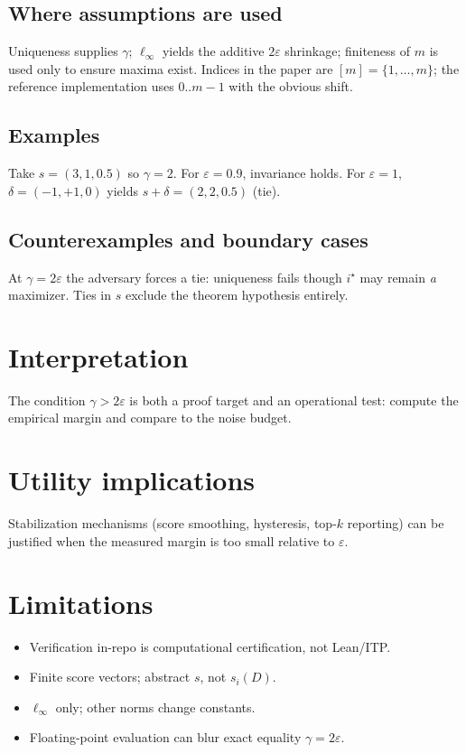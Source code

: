 \documentclass[11pt]{article}
\begin{document}
\subsection{Where assumptions are used}
Uniqueness supplies \(\gamma\); \(\ell_\infty\) yields the additive \(2\varepsilon\)
shrinkage; finiteness of \(m\) is used only to ensure maxima exist.
Indices in the paper are \([m]=\{1,\dots,m\}\); the reference implementation
uses \(0..m-1\) with the obvious shift.

\subsection{Examples}
Take \(s=(3,1,0.5)\) so \(\gamma=2\). For \(\varepsilon=0.9\), invariance holds.
For \(\varepsilon=1\), \(\delta=(-1,+1,0)\) yields \(s+\delta=(2,2,0.5)\) (tie).

\subsection{Counterexamples and boundary cases}
At \(\gamma=2\varepsilon\) the adversary forces a tie: uniqueness fails though
\(i^\star\) may remain \emph{a} maximizer.
Ties in \(s\) exclude the theorem hypothesis entirely.

\section{Interpretation}
The condition \(\gamma>2\varepsilon\) is both a proof target and an operational
test: compute the empirical margin and compare to the noise budget.

\section{Utility implications}
Stabilization mechanisms (score smoothing, hysteresis, top-\(k\) reporting) can
be justified when the measured margin is too small relative to \(\varepsilon\).

\section{Limitations}
\begin{itemize}
\item Verification in-repo is computational certification, not Lean/ITP.
\item Finite score vectors; abstract \(s\), not \(s_i(D)\).
\item \(\ell_\infty\) only; other norms change constants.
\item Floating-point evaluation can blur exact equality \(\gamma=2\varepsilon\).
\end{itemize}
\end{document}
